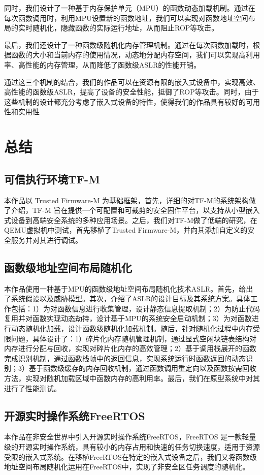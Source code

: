 \documentclass[UTF8,12pt,a4paper]{ctexart}
\numberwithin{figure}{section}
\begin{document}
\par 同时，我们设计了一种基于内存保护单元（MPU）的函数动态加载机制。通过在每次函数调用时，利用MPU设置新的函数地址，我们可以实现对函数地址空间布局的实时随机化，隐藏函数的实际运行地址，从而阻止ROP等攻击。

\par 最后，我们还设计了一种函数级随机化内存管理机制。通过在每次函数加载时，根据函数的大小和当前内存的使用情况，动态地分配内存空间，我们可以实现高利用率、高性能的内存管理，从而降低了函数级ASLR的性能开销。

\par 通过这三个机制的结合，我们的作品可以在资源有限的嵌入式设备中，实现高效、高性能的函数级ASLR，提高了设备的安全性能，抵御了ROP等攻击。同时，由于这些机制的设计都充分考虑了嵌入式设备的特性，使得我们的作品具有较好的可用性和实用性


\section{总结}
\subsection{可信执行环境TF-M}
\par 本作品以 Trusted Firmware-M 为基础框架，首先，详细的对TF-M的系统架构做了介绍，TF-M 旨在提供一个可配置和可裁剪的安全固件平台，以支持从小型嵌入式设备到高端安全系统的多种应用场景。之后，我们对TF-M做了低端的研究，在QEMU虚拟机中测试，首先移植了Trusted Firmware-M，并向其添加自定义的安全服务并对其进行调试。
\subsection{函数级地址空间布局随机化}
\par 本作品使用一种基于MPU的函数级地址空间布局随机化技术ASLR。首先，给出了系统假设以及威胁模型。其次，介绍了ASLR的设计目标及其系统方案。具体工作包括：1）为对函数信息进行收集管理，设计静态信息提取机制；2）为防止代码复用并对函数实现动态劫持，设计基于MPU的系统安全启动机制；3）为对函数进行动态随机化加载，设计函数级随机化加载机制。随后，针对随机化过程中内存受限问题，具体设计了：1）碎片化内存随机管理机制，通过显式空闲块链表结构对内存进行分配与回收，实现对碎片化内存的高效管理；2）基于调用栈展开的函数完成识别机制，通过函数栈帧中的返回信息，实现系统运行时函数返回的动态识别；3）基于函数级缓存的内存回收机制，通过函数调用重定向以及函数按需回收方法，实现对随机加载区域中函数内存的高利用率。最后，我们在原型系统中对其进行了性能测试。
\subsection{开源实时操作系统FreeRTOS}
\par 本作品在非安全世界中引入开源实时操作系统FreeRTOS，FreeRTOS 是一款轻量级的开源实时操作系统，具有较小的内存占用和快速的任务切换速度，适用于资源受限的嵌入式系统。在移植FreeRTOS在特定的嵌入式设备之后，我们又将函数级地址空间布局随机化运用在FreeRTOS中，实现了非安全区任务调度的随机化。
\clearpage
\pagestyle{refStyle}


\end{document}
